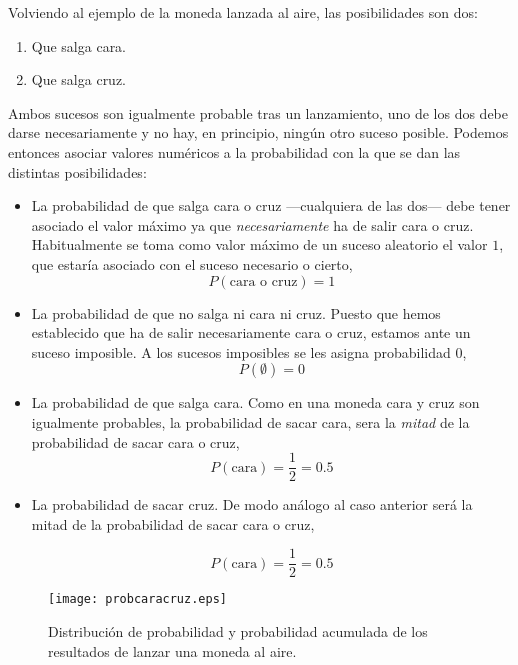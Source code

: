 Volviendo al ejemplo de la moneda  lanzada al aire, las posibilidades son dos:
\begin{enumerate}
\item Que salga cara.
\item Que salga cruz.
\end{enumerate}
Ambos sucesos son igualmente probable tras un lanzamiento, uno de los dos debe darse necesariamente y no hay, en principio, ningún otro suceso posible. Podemos entonces asociar valores numéricos a la probabilidad con la que se dan las distintas posibilidades:
\begin{itemize}
\item La probabilidad de que salga cara o cruz ---cualquiera de las dos--- debe tener asociado el valor máximo ya que \emph{necesariamente} ha de salir cara o cruz.  Habitualmente se toma como valor máximo de un suceso aleatorio el valor $1$, que estaría asociado con el suceso necesario o cierto,
\begin{equation*}
P(\text{cara o cruz}) = 1
\end{equation*}

\item La probabilidad de que no salga ni cara ni cruz. Puesto que hemos establecido que ha de salir necesariamente cara o cruz, estamos ante un suceso imposible. A los sucesos imposibles se les asigna probabilidad $0$,
\begin{equation*}
P(\emptyset) = 0
\end{equation*}

\item La probabilidad de que salga cara. Como en una moneda cara y cruz son igualmente probables,  la probabilidad de sacar cara, sera la \emph{mitad} de la probabilidad de sacar cara o cruz,
\begin{equation*}
P(\text{cara})=\frac{1}{2}=0.5
\end{equation*}

\item La probabilidad de sacar cruz. De modo análogo al caso anterior será la mitad de la probabilidad de sacar cara o cruz, 

\begin{equation*}
P(\text{cara})=\frac{1}{2}=0.5
\end{equation*} 
\end{itemize}

\begin{figure}
\centering
\texttt{[image: probcaracruz.eps]}
\caption{Distribución de probabilidad y probabilidad acumulada de los resultados de lanzar una moneda al aire.}
\label{fig:moneda}
\end{figure}


